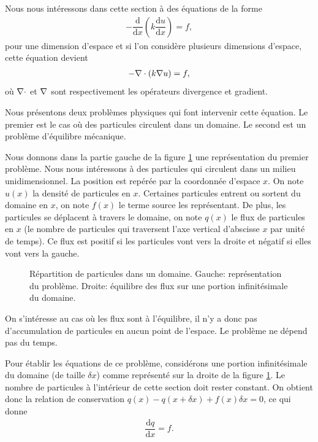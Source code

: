 \documentclass[12pt,a4paper,twoside]{article}
\begin{document}
Nous nous int\'eressons dans cette section \`a des \'equations de la forme
\begin{align}
  \label{eq:ell_1D}
  - \dfrac{\mathrm{d}}{\mathrm{d} x} \left(k \dfrac{\mathrm{d} u}{\mathrm{d} x} \right) = f ,
\end{align}
pour une dimension d'espace et
si l'on consid\`ere plusieurs dimensions d'espace, cette \'equation devient
\begin{align}
  \label{eq:ell_2D}
  - \DIV \left(k \GRAD u \right) = f ,
\end{align}
o\`u $\DIV$ et $\GRAD$ sont respectivement les op\'erateurs divergence et gradient.


Nous pr\'esentons deux probl\`emes physiques qui font intervenir
cette \'equation.
Le premier est le cas o\`u des particules circulent dans un domaine.
Le second est un probl\`eme d'\'equilibre m\'ecanique.


Nous donnons dans la partie gauche de la figure \ref{fig:flux} 
une repr\'esentation du premier probl\`eme.
Nous nous int\'eressons \`a des particules qui circulent 
dans un milieu unidimensionnel. La position est
rep\'er\'ee par la coordonn\'ee d'espace $x$. On note $u(x)$ la densit\'e
de particules en $x$. Certaines particules entrent ou sortent du domaine
en $x$, on note $f(x)$ le terme source les repr\'esentant.
De plus, les particules se d\'eplacent \`a travers le domaine,
on note $q(x)$ le flux de particules en $x$
(le nombre de particules qui traversent l'axe vertical d'abscisse $x$
par unit\'e de temps). Ce flux est positif si les particules 
vont vers la droite et n\'egatif si elles vont vers la gauche.

\begin{figure}
\begin{tikzpicture}[scale = 3]
  
\end{tikzpicture}
\begin{tikzpicture}[scale = 2.5]
  
\end{tikzpicture}
\caption{R\'epartition de particules dans un domaine. Gauche: repr\'esentation du probl\`eme.
  Droite: \'equilibre des flux sur une portion infinit\'esimale du domaine.}
\label{fig:flux}
\end{figure}


On s'int\'eresse au cas o\`u les flux sont \`a l'\'equilibre, il n'y
a donc pas d'accumulation de particules en aucun point de l'espace.
Le probl\`eme ne d\'epend pas du temps.


Pour \'etablir les \'equations de ce probl\`eme,
consid\'erons une portion infinit\'esimale du domaine (de taille $\delta x$) comme
repr\'esent\'e sur la droite de la figure \ref{fig:flux}.
Le nombre de particules \`a l'int\'erieur de cette section doit
rester constant.
On obtient donc la relation de conservation
$q(x) - q(x+\delta x) + f(x) \delta x = 0$,
ce qui donne
\begin{align}
  \label{eq:eq_flux}
  \dfrac{\mathrm{d} q}{\mathrm{d} x} = f .
\end{align}
\end{document}
